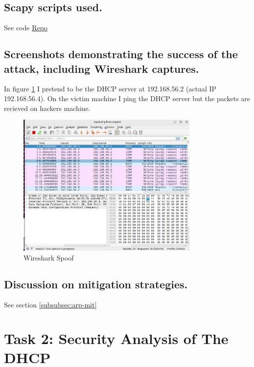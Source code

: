 \documentclass{article}
\begin{document}
\subsection*{Scapy scripts used.}

See code \href{https://github.com/MattBelanger321/COMP8670/tree/master/lab3/task1}{Repo}

\subsection*{Screenshots demonstrating the success of the attack, including Wireshark captures.}

In figure \ref{fig:wireshark-proof} I pretend to be the DHCP server at 192.168.56.2 (actual IP 192.168.56.4). On the victim machine I ping the DHCP server but the packets are recieved on hackers machine.

\begin{figure}[h]
    \centering
    \includegraphics[width=0.8\textwidth]{task1/screenshot/wireshark_spoof_proof.png}
    \caption{Wireshark Spoof}
    \label{fig:wireshark-proof}
\end{figure}

\subsection*{Discussion on mitigation strategies.}

See section \ref{subsubsec:arp-mit}

\newpage


\section{Task 2: Security Analysis of The DHCP}
\end{document}
